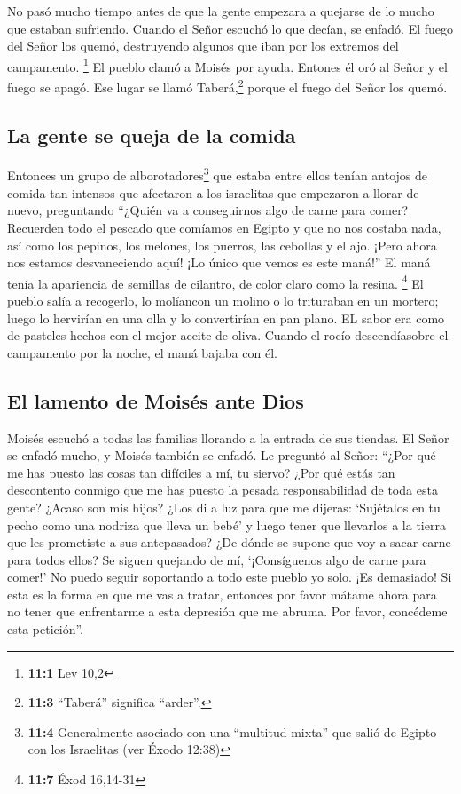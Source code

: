  No pasó mucho tiempo antes de que la gente empezara a
quejarse de lo mucho que estaban sufriendo. Cuando el Señor escuchó lo
que decían, se enfadó. El fuego del Señor los quemó, destruyendo algunos
que iban por los extremos del campamento. \footnote{\textbf{11:1} Lev
  10,2}  El pueblo clamó a Moisés por ayuda. Entones él
oró al Señor y el fuego se apagó.  Ese lugar se llamó
Taberá,\footnote{\textbf{11:3} ``Taberá'' significa ``arder''.} porque
el fuego del Señor los quemó.

\hypertarget{la-gente-se-queja-de-la-comida}{%
\subsection{La gente se queja de la
comida}\label{la-gente-se-queja-de-la-comida}}

 Entonces un grupo de alborotadores\footnote{\textbf{11:4}
  Generalmente asociado con una ``multitud mixta'' que salió de Egipto
  con los Israelitas (ver Éxodo 12:38)} que estaba entre ellos tenían
antojos de comida tan intensos que afectaron a los israelitas que
empezaron a llorar de nuevo, preguntando ``¿Quién va a conseguirnos algo
de carne para comer?  Recuerden todo el pescado que
comíamos en Egipto y que no nos costaba nada, así como los pepinos, los
melones, los puerros, las cebollas y el ajo.  ¡Pero ahora
nos estamos desvaneciendo aquí! ¡Lo único que vemos es este maná!''
 El maná tenía la apariencia de semillas de cilantro, de
color claro como la resina. \footnote{\textbf{11:7} Éxod 16,14-31}
 El pueblo salía a recogerlo, lo molíancon un molino o lo
trituraban en un mortero; luego lo hervirían en una olla y lo
convertirían en pan plano. EL sabor era como de pasteles hechos con el
mejor aceite de oliva.  Cuando el rocío descendíasobre el
campamento por la noche, el maná bajaba con él.

\hypertarget{el-lamento-de-moisuxe9s-ante-dios}{%
\subsection{El lamento de Moisés ante
Dios}\label{el-lamento-de-moisuxe9s-ante-dios}}

 Moisés escuchó a todas las familias llorando a la
entrada de sus tiendas. El Señor se enfadó mucho, y Moisés también se
enfadó.  Le preguntó al Señor: ``¿Por qué me has puesto
las cosas tan difíciles a mí, tu siervo? ¿Por qué estás tan descontento
conmigo que me has puesto la pesada responsabilidad de toda esta gente?
 ¿Acaso son mis hijos? ¿Los di a luz para que me dijeras:
`Sujétalos en tu pecho como una nodriza que lleva un bebé' y luego tener
que llevarlos a la tierra que les prometiste a sus antepasados?
 ¿De dónde se supone que voy a sacar carne para todos
ellos? Se siguen quejando de mí, `¡Consíguenos algo de carne para
comer!'  No puedo seguir soportando a todo este pueblo yo
solo. ¡Es demasiado!  Si esta es la forma en que me vas a
tratar, entonces por favor mátame ahora para no tener que enfrentarme a
esta depresión que me abruma. Por favor, concédeme esta petición''.

